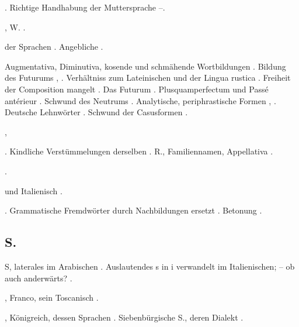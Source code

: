 \begin{register}
. Richtige Handhabung der Muttersprache \pageref{sp.61}–\pageref{sp.63}.


, W. \pageref{sp.193}.


 der Sprachen \pageref{sp.381}. Angebliche \pageref{sp.396}.

 Augmentativa, Diminutiva, kosende und schmähende Wortbildungen \pageref{sp.95}. Bildung des Futurums \pageref{sp.159}, \pageref{sp.348}. Verhältniss zum Lateinischen und der Lingua rustica \pageref{sp.183}. Freiheit der Composition mangelt \pageref{sp.236}. Das Futurum \pageref{sp.241}. Plusquamperfectum und Passé antérieur \pageref{sp.253}. Schwund des Neutrums \pageref{sp.254}. Analytische, periphrastische Formen \pageref{sp.257}, \pageref{sp.349}. Deutsche Lehnwörter \pageref{sp.264}.   Schwund der Casusformen \pageref{sp.354}.


,  

. Kindliche Verstümmelungen derselben \sed{\pageref{sp.207},} \pageref{sp.277}. R., Familiennamen, Appellativa \pageref{sp.307}.

 \pageref{sp.149}.

 und Italienisch \pageref{sp.74}. 

. Grammatische Fremdwörter durch Nachbildungen ersetzt \pageref{sp.263}. Betonung \pageref{sp.431}.

\subsection*{S.}\label{reg.S}

S, laterales im Arabischen \pageref{sp.187}.  Auslautendes s in i verwandelt im Italienischen; – ob auch anderwärts? \pageref{sp.191}.


, Franco, sein Toscanisch \pageref{sp.139}.

, Königreich, dessen Sprachen \pageref{sp.54}. Siebenbürgische S., deren Dialekt \pageref{sp.190}.


\end{register}
